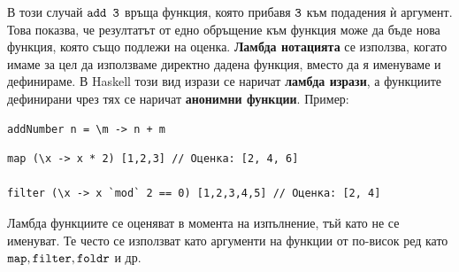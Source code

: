 \documentclass{article}
\newcommand{\cppplain}[1]{\textcolor{black}{\texttt{#1}}}
\begin{document}
В този случай $\cppplain{add 3}$ връща функция, която прибавя $\cppplain{3}$ към подадения ѝ аргумент. Това показва, че резултатът от едно обръщение към
функция може да бъде нова функция, която също подлежи на оценка. \newline\newline
\textbf{Ламбда нотацията} се използва, когато имаме за цел да използваме директно дадена функция, вместо да я именуваме и дефинираме.
В Haskell този вид изрази се наричат \textbf{ламбда изрази}, а функциите дефинирани чрез тях се наричат \textbf{анонимни функции}. \newline\newline
Пример: \begin{lstlisting}[style=cpp]
addNumber n = \m -> n + m
\end{lstlisting}
\begin{lstlisting}[style=cpp]
map (\x -> x * 2) [1,2,3] // Оценка: [2, 4, 6]

filter (\x -> x `mod` 2 == 0) [1,2,3,4,5] // Оценка: [2, 4]
\end{lstlisting}

Ламбда функциите се оценяват в момента на изпълнение, тъй като не се именуват.
Те често се използват като аргументи на функции от по-висок ред като $\cppplain{map}, \cppplain{filter}, \cppplain{foldr}$ и др.
\end{document}
